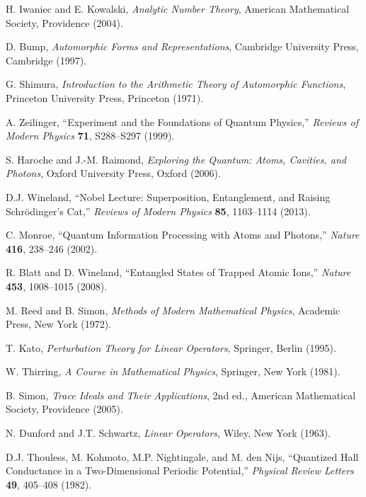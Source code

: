 \documentclass[11pt]{article}
\theoremstyle{plain}
\theoremstyle{definition}
\theoremstyle{remark}
\begin{document}
\begin{thebibliography}{99}
 H. Iwaniec and E. Kowalski, \emph{Analytic Number Theory}, American Mathematical Society, Providence (2004).

 D. Bump, \emph{Automorphic Forms and Representations}, Cambridge University Press, Cambridge (1997).

 G. Shimura, \emph{Introduction to the Arithmetic Theory of Automorphic Functions}, Princeton University Press, Princeton (1971).

 A. Zeilinger, ``Experiment and the Foundations of Quantum Physics,'' \emph{Reviews of Modern Physics} \textbf{71}, S288--S297 (1999).

 S. Haroche and J.-M. Raimond, \emph{Exploring the Quantum: Atoms, Cavities, and Photons}, Oxford University Press, Oxford (2006).

 D.J. Wineland, ``Nobel Lecture: Superposition, Entanglement, and Raising Schrödinger's Cat,'' \emph{Reviews of Modern Physics} \textbf{85}, 1103--1114 (2013).

 C. Monroe, ``Quantum Information Processing with Atoms and Photons,'' \emph{Nature} \textbf{416}, 238--246 (2002).

 R. Blatt and D. Wineland, ``Entangled States of Trapped Atomic Ions,'' \emph{Nature} \textbf{453}, 1008--1015 (2008).

 M. Reed and B. Simon, \emph{Methods of Modern Mathematical Physics}, Academic Press, New York (1972).

 T. Kato, \emph{Perturbation Theory for Linear Operators}, Springer, Berlin (1995).

 W. Thirring, \emph{A Course in Mathematical Physics}, Springer, New York (1981).

 B. Simon, \emph{Trace Ideals and Their Applications}, 2nd ed., American Mathematical Society, Providence (2005).

 N. Dunford and J.T. Schwartz, \emph{Linear Operators}, Wiley, New York (1963).

 D.J. Thouless, M. Kohmoto, M.P. Nightingale, and M. den Nijs, ``Quantized Hall Conductance in a Two-Dimensional Periodic Potential,'' \emph{Physical Review Letters} \textbf{49}, 405--408 (1982).


\end{thebibliography}
\end{document}
